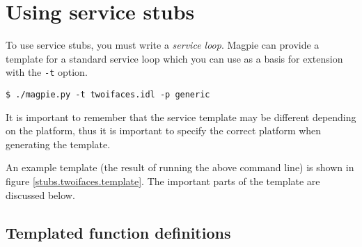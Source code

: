 \section{Using service stubs}

To use service stubs, you must write a {\it service loop}. Magpie can provide a template for a standard service loop which you can use as a basis for extension with the {\tt -t} option.

\begin{verbatim}
$ ./magpie.py -t twoifaces.idl -p generic
\end{verbatim}

It is important to remember that the service template may be different depending on the platform, thus it is important to specify the correct platform when generating the template.

An example template (the result of running the above command line) is shown in figure \ref{stubs.twoifaces.template}. The important parts of the template are discussed below.

\subsection{Templated function definitions}


